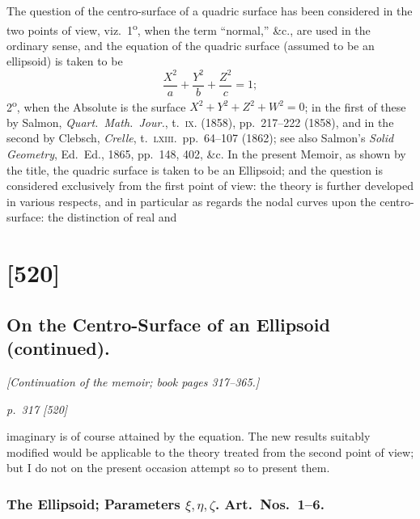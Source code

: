 \documentclass[11pt,a4paper]{book}
\begin{document}
The question of the centro-surface of a quadric surface has been considered in the two points of view, viz.\ 1\textsuperscript{o}, when the term ``normal,'' \&c., are used in the ordinary sense, and the equation of the quadric surface (assumed to be an ellipsoid) is taken to be
\[
\frac{X^2}{a} + \frac{Y^2}{b} + \frac{Z^2}{c} = 1;
\]
2\textsuperscript{o}, when the Absolute is the surface $X^2 + Y^2 + Z^2 + W^2 = 0$; in the first of these by Salmon, \textit{Quart.\ Math.\ Jour.}, t.~\textsc{ix.} (1858), pp.~217--222 (1858), and in the second by Clebsch, \textit{Crelle}, t.~\textsc{lxiii.}\ pp.~64--107 (1862); see also Salmon's \textit{Solid Geometry}, Ed.\ Ed., 1865, pp.~148, 402, \&c. In the present Memoir, as shown by the title, the quadric surface is taken to be an Ellipsoid; and the question is considered exclusively from the first point of view: the theory is further developed in various respects, and in particular as regards the nodal curves upon the centro-surface: the distinction of real and

\clearpage
\clearpage


\section{[520]}
\subsection{On the Centro-Surface of an Ellipsoid (continued).}

\begin{center}
\textit{[Continuation of the memoir; book pages 317--365.]}
\end{center}

\bigskip
\textit{p.~317 [520]}
\smallskip

\noindent
imaginary is of course attained by the equation. The new results suitably modified
would be applicable to the theory treated from the second point of view; but I do not
on the present occasion attempt so to present them.

\subsubsection*{The Ellipsoid; Parameters $\xi,\eta,\zeta$. Art.\ Nos.\ 1--6.}
\end{document}
